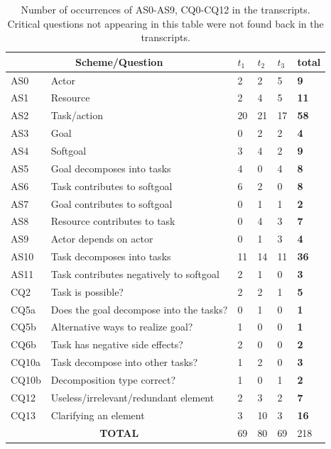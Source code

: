 \begin{table}[ht]
\centering
\begin{tabularx}{0.5\textwidth}{|l|X|l|l|l|>{\bfseries}l|}
\hline
\multicolumn{2}{|c|}{\textbf{Scheme/Question}} & $t_1$ & $t_2$ & $t_3$ & \textbf{total}\\
\hline 
AS0 & Actor & 2 & 2 & 5 & 9\\
\hline
AS1 & Resource & 2 & 4 & 5 & 11\\
\hline
AS2 & Task/action & 20 & 21 & 17 & 58\\
\hline
AS3 & Goal & 0 & 2 & 2 & 4\\
\hline
AS4 & Softgoal & 3 & 4 & 2 & 9\\
\hline
AS5 & Goal decomposes into tasks & 4 &0& 4 & 8\\
\hline
AS6 & Task contributes to softgoal & 6 & 2 &0& 8\\
\hline
AS7 & Goal contributes to softgoal &0& 1 & 1 & 2\\
\hline
AS8 & Resource contributes to task & 0 & 4 & 3 & 7\\
\hline
AS9 & Actor depends on actor &0& 1 & 3 & 4\\
\hline
AS10 & Task decomposes into tasks & 11 &14 &11 &36\\ 
\hline
AS11 & Task contributes negatively to softgoal & 2 & 1 & 0 & 3\\
\hline
\hline
CQ2 & Task is possible? & 2 & 2 & 1 & 5\\
\hline		
CQ5a & Does the goal decompose into the tasks? & 0 & 1 & 0 & 1\\
\hline
CQ5b & Alternative ways to realize goal? & 1 & 0 & 0 & 1\\
\hline
CQ6b & Task has negative side effects? & 2 & 0 & 0 & 2\\
\hline
CQ10a & Task decompose into other tasks? & 1 &2 &0&3\\
\hline
CQ10b & Decomposition type correct? &1 &0& 1 &2\\
\hline
\hline
CQ12 & Useless/irrelevant/redundant element & 2 & 3 & 2 &7\\
\hline
CQ13 & Clarifying an element &3 &10 & 3 & 16\\
\hline
\hline
\multicolumn{2}{|c|}{\textbf{TOTAL}}&69&80&69&218\\
\hline
\end{tabularx}
\caption{Number of occurrences of AS0-AS9, CQ0-CQ12 in the transcripts. Critical questions not appearing in this table were not found back in the transcripts.}
\label{table:transcripts:results:argumentschemes}
\end{table}

